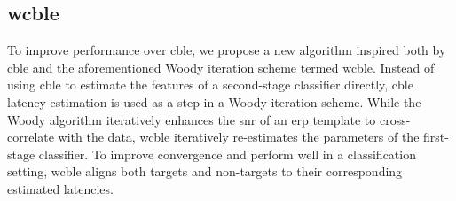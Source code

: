 \subsection{\acl{wcble}}
\label{sec:wcble/methods/wcble}
To improve performance over \ac{cble}, we propose a new algorithm inspired both by
\ac{cble} and the aforementioned Woody iteration scheme termed \ac{wcble}.
Instead of using \ac{cble} to estimate the features of a second-stage classifier
directly, \ac{cble} latency estimation is used as a step in a Woody iteration scheme.
While the Woody algorithm iteratively enhances the \ac{snr} of an \ac{erp} template to
cross-correlate with the data, \ac{wcble} iteratively re-estimates the parameters of
the first-stage classifier.
To improve convergence and perform well in a classification setting, \ac{wcble}
aligns both targets and non-targets to their corresponding estimated latencies.

